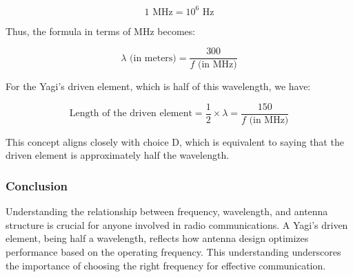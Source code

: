 \[
1 \text{ MHz} = 10^6 \text{ Hz}
\]

Thus, the formula in terms of MHz becomes:

\[
\lambda \text{ (in meters)} = \frac{300}{f \text{ (in MHz)}}
\]

For the Yagi’s driven element, which is half of this wavelength, we have:

\[
\text{Length of the driven element} = \frac{1}{2} \times \lambda = \frac{150}{f \text{ (in MHz)}}
\]

This concept aligns closely with choice D, which is equivalent to saying that the driven element is approximately half the wavelength.

\subsubsection{Conclusion}

Understanding the relationship between frequency, wavelength, and antenna structure is crucial for anyone involved in radio communications. A Yagi’s driven element, being half a wavelength, reflects how antenna design optimizes performance based on the operating frequency. This understanding underscores the importance of choosing the right frequency for effective communication.

